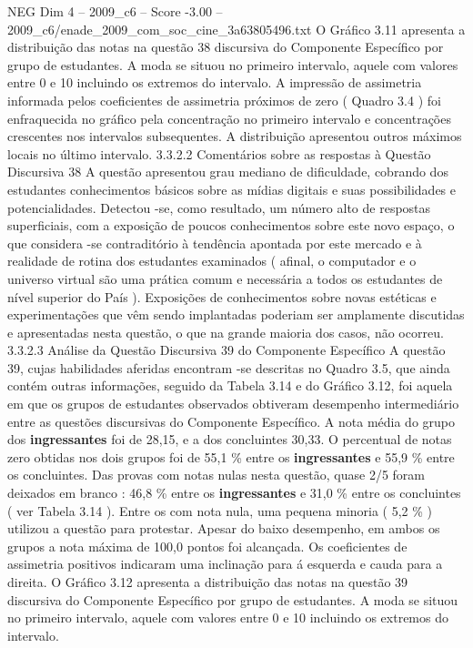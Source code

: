 \begin{textsample}{NEG Dim 4 – 2009\_c6 – Score -3.00 – 2009\_c6/enade\_2009\_com\_soc\_cine\_3a63805496.txt}
O Gráfico 3.11 apresenta a distribuição das notas na questão 38 discursiva do Componente Específico por grupo de estudantes.
A moda se situou no primeiro intervalo, aquele com valores entre 0 e 10 incluindo os extremos do intervalo.
A impressão de assimetria informada pelos coeficientes de assimetria próximos de zero ( Quadro 3.4 ) foi enfraquecida no gráfico pela concentração no primeiro intervalo e concentrações crescentes nos intervalos subsequentes.
A distribuição apresentou outros máximos locais no último intervalo. 3.3.2.2 Comentários sobre as respostas à Questão Discursiva 38 A questão apresentou grau mediano de dificuldade, cobrando dos estudantes conhecimentos básicos sobre as mídias digitais e suas possibilidades e potencialidades.
Detectou -se, como resultado, um número alto de respostas superficiais, com a exposição de poucos conhecimentos sobre este novo espaço, o que considera -se contraditório à tendência apontada por este mercado e à realidade de rotina dos estudantes examinados ( afinal, o computador e o universo virtual são uma prática comum e necessária a todos os estudantes de nível superior do País ).
Exposições de conhecimentos sobre novas estéticas e experimentações que vêm sendo implantadas poderiam ser amplamente discutidas e apresentadas nesta questão, o que na grande maioria dos casos, não ocorreu. 3.3.2.3 Análise da Questão Discursiva 39 do Componente Específico A questão 39, cujas habilidades aferidas encontram -se descritas no Quadro 3.5, que ainda contém outras informações, seguido da Tabela 3.14 e do Gráfico 3.12, foi aquela em que os grupos de estudantes observados obtiveram desempenho intermediário entre as questões discursivas do Componente Específico.
A nota média do grupo dos \textbf{ingressantes} foi de 28,15, e a dos concluintes 30,33.
O percentual de notas zero obtidas nos dois grupos foi de 55,1 \% entre os \textbf{ingressantes} e 55,9 \% entre os concluintes.
Das provas com notas nulas nesta questão, quase 2/5 foram deixados em branco : 46,8 \% entre os \textbf{ingressantes} e 31,0 \% entre os concluintes ( ver Tabela 3.14 ).
Entre os com nota nula, uma pequena minoria ( 5,2 \% ) utilizou a questão para protestar.
Apesar do baixo desempenho, em ambos os grupos a nota máxima de 100,0 pontos foi alcançada.
Os coeficientes de assimetria positivos indicaram uma inclinação para á esquerda e cauda para a direita.
O Gráfico 3.12 apresenta a distribuição das notas na questão 39 discursiva do Componente Específico por grupo de estudantes.
A moda se situou no primeiro intervalo, aquele com valores entre 0 e 10 incluindo os extremos do intervalo.

\end{textsample}
